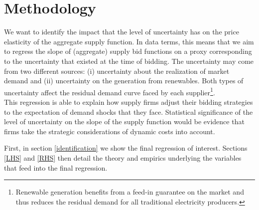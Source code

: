 \section{Methodology}
\label{newapproach}
We want to identify the impact that the level 
of 
uncertainty has on the price elasticity of the aggregate supply function. In data terms, this means that we aim to regress the slope of (aggregate) supply bid functions on a proxy corresponding to the uncertainty that existed at the time of bidding. The uncertainty may come from two different sources: (i) uncertainty about the realization of market demand and (ii) uncertainty on the generation from renewables. Both types of uncertainty affect the residual demand curve faced by each supplier\footnote{Renewable generation benefits from a feed-in guarantee on the market and thus reduces the residual demand for all traditional electricity producers.}.\\

This regression is able to explain how supply firms adjust their bidding strategies to the expectation of demand shocks that they face. Statistical significance of the level of uncertainty on the slope of the supply function would be evidence that firms take the strategic considerations of dynamic costs into account. \\


\label{strat}

First, in section \ref{identification} we show the final regression of interest. Sections \ref{LHS} and \ref{RHS} then detail the theory and empirics underlying the variables that feed into the final regression. \\

